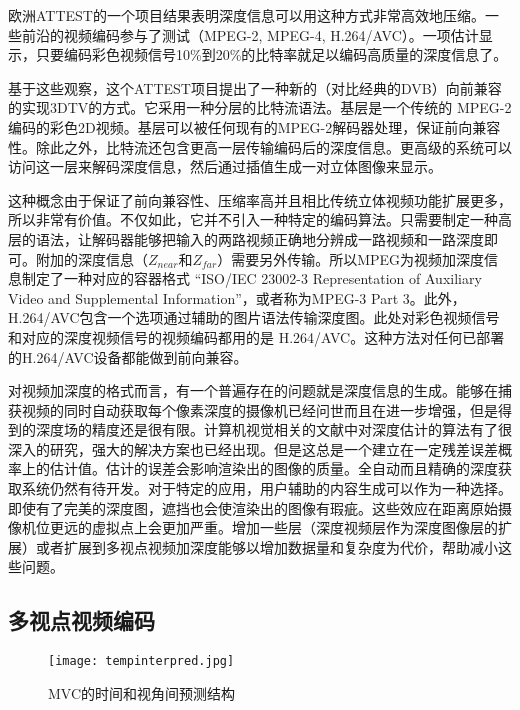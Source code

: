 欧洲ATTEST的一个项目\cite{fehn2002evolutionary}结果表明深度信息可以用这种方式非常高效地压缩。一些前沿的视频编码参与了测试（MPEG-2, MPEG-4, H.264/AVC）。一项估计显示，只要编码彩色视频信号10\%到20\%的比特率就足以编码高质量的深度信息了。

基于这些观察，这个ATTEST项目提出了一种新的（对比经典的DVB）向前兼容的实现3DTV的方式。它采用一种分层的比特流语法。基层是一个传统的 MPEG-2编码的彩色2D视频。基层可以被任何现有的MPEG-2解码器处理，保证前向兼容性。除此之外，比特流还包含更高一层传输编码后的深度信息。更高级的系统可以访问这一层来解码深度信息，然后通过插值生成一对立体图像来显示。

这种概念由于保证了前向兼容性、压缩率高并且相比传统立体视频功能扩展更多，所以非常有价值。不仅如此，它并不引入一种特定的编码算法。只需要制定一种高层的语法，让解码器能够把输入的两路视频正确地分辨成一路视频和一路深度即可。附加的深度信息（$Z_{near}$和$Z_{far}$）需要另外传输。所以MPEG为视频加深度信息制定了一种对应的容器格式 “ISO/IEC 23002-3 Representation of Auxiliary Video and Supplemental Information”，或者称为MPEG-3 Part 3\cite{iso2007rep, iso2007fdam}。此外，H.264/AVC包含一个选项通过辅助的图片语法传输深度图。此处对彩色视频信号和对应的深度视频信号的视频编码都用的是 H.264/AVC。这种方法对任何已部署的H.264/AVC设备都能做到前向兼容。

对视频加深度的格式而言，有一个普遍存在的问题就是深度信息的生成。能够在捕获视频的同时自动获取每个像素深度的摄像机已经问世而且在进一步增强，但是得到的深度场的精度还是很有限。计算机视觉相关的文献中对深度估计的算法有了很深入的研究，强大的解决方案也已经出现。但是这总是一个建立在一定残差误差概率上的估计值。估计的误差会影响渲染出的图像的质量。全自动而且精确的深度获取系统仍然有待开发。对于特定的应用，用户辅助的内容生成可以作为一种选择。即使有了完美的深度图，遮挡也会使渲染出的图像有瑕疵。这些效应在距离原始摄像机位更远的虚拟点上会更加严重。增加一些层（深度视频层作为深度图像层的扩展\cite{shade1998layered}）或者扩展到多视点视频加深度\cite{zitnick2004high, kauff2007depth}能够以增加数据量和复杂度为代价，帮助减小这些问题。

\subsection{多视点视频编码}

\begin{figure}[htbp]
\begin{center}
\texttt{[image: tempinterpred.jpg]}
\caption{MVC的时间和视角间预测结构}
\label{fig:tempinterpredchs}
\end{center}
\end{figure}

